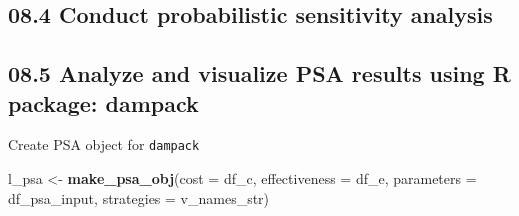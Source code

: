\documentclass[
]{article}
\newenvironment{Shaded}{\begin{snugshade}}{\end{snugshade}}
\newcommand{\CharTok}[1]{\textcolor[rgb]{0.31,0.60,0.02}{#1}}
\newcommand{\CommentTok}[1]{\textcolor[rgb]{0.56,0.35,0.01}{\textit{#1}}}
\newcommand{\ControlFlowTok}[1]{\textcolor[rgb]{0.13,0.29,0.53}{\textbf{#1}}}
\newcommand{\DataTypeTok}[1]{\textcolor[rgb]{0.13,0.29,0.53}{#1}}
\newcommand{\DecValTok}[1]{\textcolor[rgb]{0.00,0.00,0.81}{#1}}
\newcommand{\KeywordTok}[1]{\textcolor[rgb]{0.13,0.29,0.53}{\textbf{#1}}}
\newcommand{\NormalTok}[1]{#1}
\newcommand{\OperatorTok}[1]{\textcolor[rgb]{0.81,0.36,0.00}{\textbf{#1}}}
\newcommand{\StringTok}[1]{\textcolor[rgb]{0.31,0.60,0.02}{#1}}
\begin{document}
\hypertarget{conduct-probabilistic-sensitivity-analysis}{%
\subsection{08.4 Conduct probabilistic sensitivity
analysis}\label{conduct-probabilistic-sensitivity-analysis}}

\begin{Shaded}
\end{Shaded}

\hypertarget{analyze-and-visualize-psa-results-using-r-package-dampack}{%
\subsection{08.5 Analyze and visualize PSA results using R package:
dampack}\label{analyze-and-visualize-psa-results-using-r-package-dampack}}

Create PSA object for \texttt{dampack}

\begin{Shaded}
\begin{Highlighting}[]
\NormalTok{l_psa <-}\StringTok{ }\KeywordTok{make_psa_obj}\NormalTok{(}\DataTypeTok{cost          =}\NormalTok{ df_c, }
                      \DataTypeTok{effectiveness =}\NormalTok{ df_e, }
                      \DataTypeTok{parameters    =}\NormalTok{ df_psa_input, }
                      \DataTypeTok{strategies    =}\NormalTok{ v_names_str)}
\end{Highlighting}
\end{Shaded}
\end{document}
